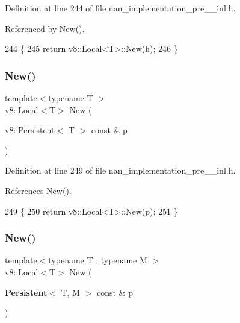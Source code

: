 Definition at line 244 of file nan\+\_\+implementation\+\_\+pre\+\_\+\_\+inl.\+h.



Referenced by New().


\begin{DoxyCode}
244                                      \{
245   \textcolor{keywordflow}{return} v8::Local<T>::New(h);
246 \}
\end{DoxyCode}
\mbox{\label{nan__implementation__pre__12__inl_8h_a7b20f161216cdbaecddf9ffe95219686}} 
\subsubsection{New()\hspace{0.1cm}{\footnotesize\ttfamily [2/4]}}
{\footnotesize\ttfamily template$<$typename T $>$ \\
v8\+::\+Local$<$T$>$ New (\begin{DoxyParamCaption}\item[{v8\+::\+Persistent$<$ T $>$ const \&}]{p }\end{DoxyParamCaption})}



Definition at line 249 of file nan\+\_\+implementation\+\_\+pre\+\_\+\_\+inl.\+h.



References New().


\begin{DoxyCode}
249                                                 \{
250   \textcolor{keywordflow}{return} v8::Local<T>::New(p);
251 \}
\end{DoxyCode}
\mbox{\label{nan__implementation__pre__12__inl_8h_a4c6a402f49f0cb9574fa28e93691c423}} 
\subsubsection{New()\hspace{0.1cm}{\footnotesize\ttfamily [3/4]}}
{\footnotesize\ttfamily template$<$typename T , typename M $>$ \\
v8\+::\+Local$<$T$>$ New (\begin{DoxyParamCaption}\item[{\textbf{ Persistent}$<$ T, M $>$ const \&}]{p }\end{DoxyParamCaption})}



